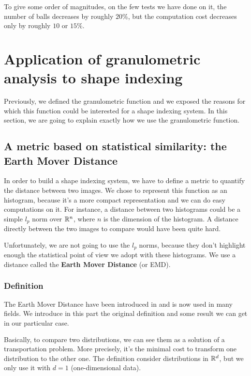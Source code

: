 To give some order of magnitudes, on the few tests we have done on it, the number of balls decreases by roughly $20 \%$, but the computation cost decreases only by roughly $10$ or $15 \%$.

\section{Application of granulometric analysis to shape indexing}

Previously, we defined the granulometric function and we exposed the reasons for which this function could be interested for a shape indexing system. In this section, we are going to explain exactly how we use the granulometric function.

\subsection{A metric based on statistical similarity: the Earth Mover Distance}

In order to build a shape indexing system, we have to define a metric to quantify the distance between two images. We chose to represent this function as an histogram, because it's a more compact representation and we can do easy computations on it. For instance, a distance between two histograms could be a simple $l_p$ norm over $\mathbb{R}^n$, where $n$ is the dimension of the histogram. A distance directly between the two images to compare would have been quite hard.

Unfortunately, we are not going to use the $l_p$ norms, because they don't highlight enough the statistical point of view we adopt with these histograms. We use a distance called the \textbf{Earth Mover Distance} (or EMD).

\subsubsection{Definition}

The Earth Mover Distance have been introduced in \cite{EMD-def} and is now used in many fields. We introduce in this part the original definition and some result we can get in our particular case.

Basically, to compare two distributions, we can see them as a solution of a transportation problem. More precisely, it's the minimal cost to transform one distribution to the other one. The definition consider distributions in $\mathbb{R}^d$, but we only use it with $d=1$ (one-dimensional data).

